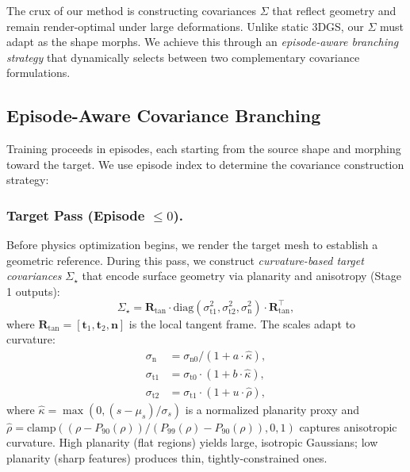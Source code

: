     The crux of our method is constructing covariances $\Sigma$ that reflect geometry and remain render-optimal under large deformations. Unlike static 3DGS, our $\Sigma$ must adapt as the shape morphs. We achieve this through an \emph{episode-aware branching strategy} that dynamically selects between two complementary covariance formulations.

\subsection{Episode-Aware Covariance Branching}

    Training proceeds in episodes, each starting from the source shape and morphing toward the target. We use episode index to determine the covariance construction strategy:
    
    \subsubsection{Target Pass (Episode $\leq 0$).}
    Before physics optimization begins, we render the target mesh to establish a geometric reference. During this pass, we construct \emph{curvature-based target covariances} $\Sigma_\star$ that encode surface geometry via planarity and anisotropy (Stage 1 outputs):
    \begin{equation}
    \label{eq:sigma_target}
    \Sigma_\star = \mathbf{R}_{\text{tan}} \cdot \text{diag}(\sigma_{\text{t1}}^2, \sigma_{\text{t2}}^2, \sigma_{\text{n}}^2) \cdot \mathbf{R}_{\text{tan}}^\top,
    \end{equation}
    where $\mathbf{R}_{\text{tan}}=[\mathbf{t}_1, \mathbf{t}_2, \mathbf{n}]$ is the local tangent frame. The scales adapt to curvature:
    \begin{equation}
    \label{eq:curvature_scales}
    \begin{aligned}
    \sigma_{\text{n}} &= \sigma_{\text{n0}} / (1 + a \cdot \hat{\kappa}), \\
    \sigma_{\text{t1}} &= \sigma_{\text{t0}} \cdot (1 + b \cdot \hat{\kappa}), \\
    \sigma_{\text{t2}} &= \sigma_{\text{t1}} \cdot (1 + u \cdot \hat{\rho}),
    \end{aligned}
    \end{equation}
    where $\hat{\kappa} = \max(0, (s - \mu_s)/\sigma_s)$ is a normalized planarity proxy and $\hat{\rho} = \text{clamp}((\rho - P_{90}(\rho))/(P_{99}(\rho) - P_{90}(\rho)), 0, 1)$ captures anisotropic curvature. High planarity (flat regions) yields large, isotropic Gaussians; low planarity (sharp features) produces thin, tightly-constrained ones.
    
